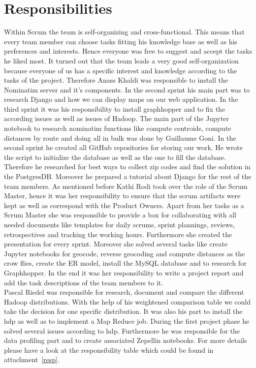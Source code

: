 
\section{Responsibilities}

Within Scrum the team is self-organizing and cross-functional. This means that every
team member can choose tasks fitting his knowledge base as well as his preferences
and interests. Hence everyone was free to suggest and accept the tasks he liked
most.
It turned out that the team leads a very good self-organization because
everyone of us has a specific interest and knowledge according to the tasks of
the project.
Therefore Anass Khaldi was responsible to install the Nominatim server
and it's components. In the second sprint his main part was to research Django
and how we can display maps on our web application. In the third sprint it was
his responsibility to install graphhopper and to fix the according issues as well
as issues of Hadoop.
The main part of the Jupyter notebook to research nominatim functions like compute
centroids, compute distances by route and doing all in bulk was done by Guillaume
Goni. In the second sprint he created all GitHub repositories for storing our work.
He wrote the script to initialize the database as well as the one to fill the database.
Therefore he researched for best ways to collect zip codes and find the solution
in the PostgresDB.\@
Moreover he prepared a tutorial about Django for the rest of the team members.
As mentioned before Kathi Rodi took over the role of the Scrum Master, hence it
was her responsibility to ensure that the scrum artifacts were kept as well as
correspond with the Product Owners. Apart from her tasks as a Scrum Master she
was responsible to provide a box for collaborating with all needed documents like
templates for daily scrums, sprint plannings, reviews, retrospectives and tracking
the working hours. Furthermore she created the presentation for every sprint.
Moreover she solved several tasks like create Jupyter notebooks for geocode,
reverse geocoding and compute distances as the crow flies, create the ER model,
install the MySQL database and to research for Graphhopper.
In the end it was her responsibility to write a project report and add the task 
descriptions of the team members to it.\\Pascal Riedel was responsible for research,
document and compare the different Hadoop distributions. With the help of his
weightened comparison table we could take the decision for one specific distribution.
It was also his part to install the \acs{hdp} as well as to implement a Map Reduce job.
During the first project phase he solved several issues according to \acs{hdp}.
Furthermore he was responsible for the data profiling part and to create associated
Zepellin notebooks.
For more details please have a look at the responsibility table which could be
found in attachment~\ref{resp}.
